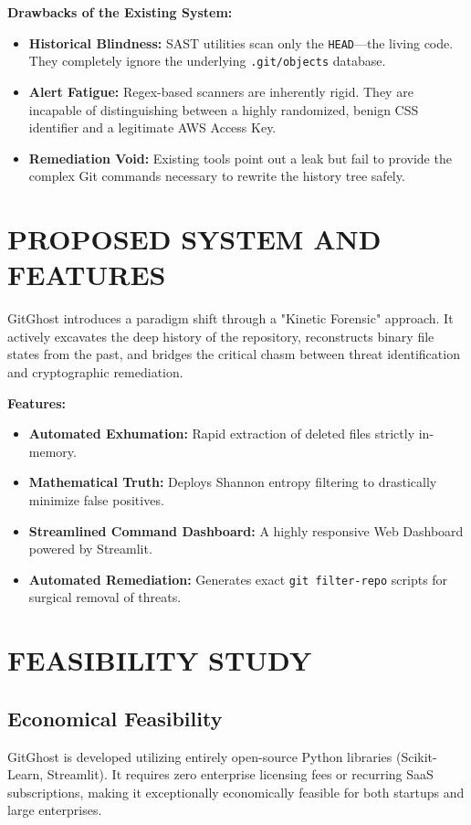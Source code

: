 \documentclass[12pt, a4paper, oneside]{report}
\begin{document}
\textbf{Drawbacks of the Existing System:}
\begin{itemize}
    \item \textbf{Historical Blindness:} SAST utilities scan only the \texttt{HEAD}---the living code. They completely ignore the underlying \texttt{.git/objects} database.
    \item \textbf{Alert Fatigue:} Regex-based scanners are inherently rigid. They are incapable of distinguishing between a highly randomized, benign CSS identifier and a legitimate AWS Access Key.
    \item \textbf{Remediation Void:} Existing tools point out a leak but fail to provide the complex Git commands necessary to rewrite the history tree safely.
\end{itemize}

\section{PROPOSED SYSTEM AND FEATURES}
GitGhost introduces a paradigm shift through a "Kinetic Forensic" approach. It actively excavates the deep history of the repository, reconstructs binary file states from the past, and bridges the critical chasm between threat identification and cryptographic remediation.

\textbf{Features:}
\begin{itemize}
    \item \textbf{Automated Exhumation:} Rapid extraction of deleted files strictly in-memory.
    \item \textbf{Mathematical Truth:} Deploys Shannon entropy filtering to drastically minimize false positives.
    \item \textbf{Streamlined Command Dashboard:} A highly responsive Web Dashboard powered by Streamlit.
    \item \textbf{Automated Remediation:} Generates exact \texttt{git filter-repo} scripts for surgical removal of threats.
\end{itemize}

\section{FEASIBILITY STUDY}

\subsection{Economical Feasibility}
GitGhost is developed utilizing entirely open-source Python libraries (Scikit-Learn, Streamlit). It requires zero enterprise licensing fees or recurring SaaS subscriptions, making it exceptionally economically feasible for both startups and large enterprises.
\end{document}
